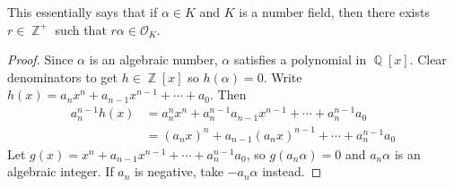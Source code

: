 \documentclass[11pt, a4paper]{memoir}
\DeclareMathOperator{\Q}{{\mathbb{Q}}}
\DeclareMathOperator{\Z}{{\mathbb{Z}}}
\theoremstyle{change}
\theoremstyle{plain}
\theoremstyle{nonumberplain}
\newtheorem{proof}{Proof}
\numberwithin{equation}{section}
\begin{document}
This essentially says that if $\alpha\in K$ and $K$ is a number field, then there exists $r\in\Z^+$ such that $r\alpha\in\mathcal{O}_K$.
\begin{proof}
    Since $\alpha$ is an algebraic number, $\alpha$ satisfies a polynomial in $\Q[x]$.
    Clear denominators to get $h\in\Z[x]$ so $h(\alpha)=0$.
    Write $h(x)=a_nx^n+a_{n-1}x^{n-1}+\cdots+a_0$.
    Then
    \begin{align*}
        a_n^{n-1}h(x)&=a_n^nx^n+a_n^{n-1}a_{n-1}x^{n-1}+\cdots+a_n^{n-1}a_0\\
                     &= (a_nx)^n+a_{n-1}(a_nx)^{n-1}+\cdots+a_n^{n-1}a_0
    \end{align*}
    Let $g(x)=x^n+a_{n-1}x^{n-1}+\cdots+a_n^{n-1}a_0$, so $g(a_n\alpha)=0$ and $a_n\alpha$ is an algebraic integer.
    If $a_n$ is negative, take $-a_n\alpha$ instead.
\end{proof}
\end{document}
